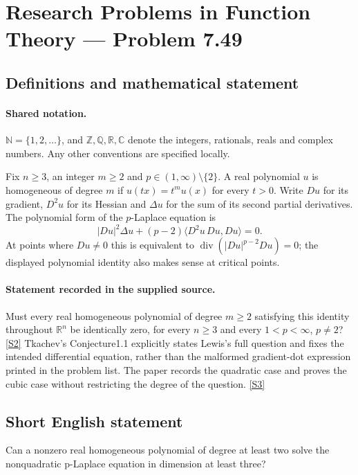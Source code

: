 \documentclass[11pt]{article}
\newcommand{\sref}[2]{\hyperlink{source:#1:#2}{[S#2]}}
\begin{document}
\section{Research Problems in Function Theory — Problem 7.49}\label{statement}

\subsection{Definitions and mathematical statement}

\paragraph{Shared notation.}$\mathbb N=\{1,2,\ldots\}$, and $\mathbb Z,\mathbb Q,\mathbb R,\mathbb C$ denote the integers, rationals, reals and complex numbers. Any other conventions are specified locally.


Fix $n\ge3$, an integer $m\ge2$ and $p\in(1,\infty)\setminus\{2\}$. A real polynomial $u$ is homogeneous of degree $m$ if $u(tx)=t^m u(x)$ for every $t>0$. Write $Du$ for its gradient, $D^2u$ for its Hessian and $\Delta u$ for the sum of its second partial derivatives. The polynomial form of the $p$-Laplace equation is
\[|Du|^2\Delta u+(p-2)\langle D^2u\,Du,Du\rangle=0.\]
At points where $Du\ne0$ this is equivalent to $\operatorname{div}(|Du|^{p-2}Du)=0$; the displayed polynomial identity also makes sense at critical points.

\paragraph{Statement recorded in the supplied source.}
Must every real homogeneous polynomial of degree $m\ge2$ satisfying this identity throughout $\mathbb R^n$ be identically zero, for every $n\ge3$ and every $1<p<\infty$, $p\ne2$? \sref{statement}{2}
Tkachev's Conjecture1.1 explicitly states Lewis's full question and fixes the intended differential equation, rather than the malformed gradient-dot expression printed in the problem list. The paper records the quadratic case and proves the cubic case without restricting the degree of the question. \sref{statement}{3}
\subsection{Short English statement}
Can a nonzero real homogeneous polynomial of degree at least two solve the nonquadratic p-Laplace equation in dimension at least three?
\end{document}
